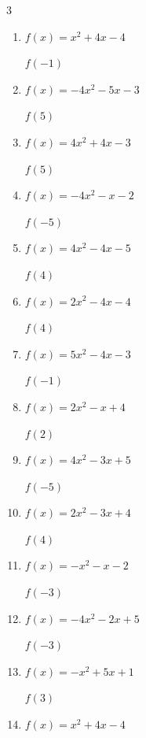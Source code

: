 \begin{multicols}{3}
\begin{enumerate}
$f(-5)$
        \phantom{$= -59$}

  \item $f(x)=x^{2}+4x-4$

$f(-1)$
        \phantom{$= -7$}

  \item $f(x)=-4x^{2}-5x-3$

$f(5)$
        \phantom{$= -128$}

  \item $f(x)=4x^{2}+4x-3$

$f(5)$
        \phantom{$= 117$}

  \item $f(x)=-4x^{2}-x-2$

$f(-5)$
        \phantom{$= -97$}

  \item $f(x)=4x^{2}-4x-5$

$f(4)$
        \phantom{$= 43$}

  \item $f(x)=2x^{2}-4x-4$

$f(4)$
        \phantom{$= 12$}

\columnbreak %

  \item $f(x)=5x^{2}-4x-3$

$f(-1)$
        \phantom{$= 6$}

  \item $f(x)=2x^{2}-x+4$

$f(2)$
        \phantom{$= 10$}

  \item $f(x)=4x^{2}-3x+5$

$f(-5)$
        \phantom{$= 120$}

  \item $f(x)=2x^{2}-3x+4$

$f(4)$
        \phantom{$= 24$}

  \item $f(x)=-x^{2}-x-2$

$f(-3)$
        \phantom{$= -8$}

  \item $f(x)=-4x^{2}-2x+5$

$f(-3)$
        \phantom{$= -25$}

  \item $f(x)=-x^{2}+5x+1$

$f(3)$
        \phantom{$= 7$}

  \item $f(x)=x^{2}+4x-4$


\end{enumerate}
\end{multicols}
